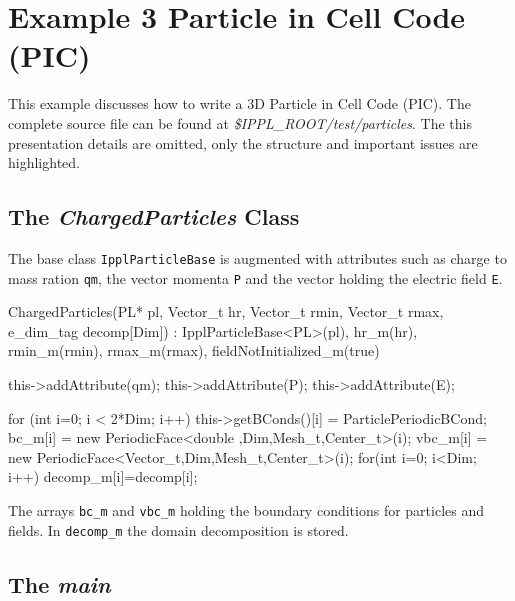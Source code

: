 

 \section{Example 3 Particle in Cell Code (PIC)}
 This example discusses how to write a 3D Particle in Cell Code (PIC). The
 complete source file can be found at {\em \$IPPL\_ROOT/test/particles}. The
 this presentation details are omitted, only the structure and important issues are
 highlighted.
 \subsection{The {\em ChargedParticles} Class}
 The base class {\tt IpplParticleBase} is augmented with attributes such as charge to mass ration
 {\tt qm}, the vector momenta {\tt P} and the vector holding the electric field {\tt E}.
 \begin{code}
 ChargedParticles(PL* pl, Vector_t hr, Vector_t rmin,
                  Vector_t rmax, e_dim_tag decomp[Dim]) :
                  IpplParticleBase<PL>(pl),
                  hr_m(hr),
                  rmin_m(rmin),
                  rmax_m(rmax),
                  fieldNotInitialized_m(true)
{
    this->addAttribute(qm);
    this->addAttribute(P);
    this->addAttribute(E);

    for (int i=0; i < 2*Dim; i++) {
        this->getBConds()[i] = ParticlePeriodicBCond;
        bc_m[i]  = new PeriodicFace<double  ,Dim,Mesh_t,Center_t>(i);
        vbc_m[i] = new PeriodicFace<Vector_t,Dim,Mesh_t,Center_t>(i);
    }
    for(int i=0; i<Dim; i++)
        decomp_m[i]=decomp[i];
}
\end{code}
The arrays {\tt bc\_m} and {\tt vbc\_m} holding the boundary conditions for particles and fields.
In {\tt decomp\_m} the domain decomposition is stored.

\subsection{The {\em main}}

